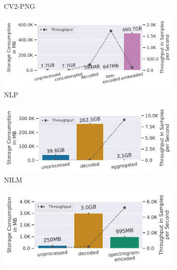 {\begin{figure}[h]
\begin{subfigure}[c]{0.22\textwidth}
        \vspace{-18pt}
        \caption{CV2-PNG}
        \label{fig:ss-vs-thr-cv2-png}
    \end{subfigure}
    \begin{subfigure}[c]{0.22\textwidth}
        \includegraphics[width=\textwidth]{figures/openwebtext-pipeline/storage-vs-throughput.pdf}
        \vspace{-18pt}
        \caption{NLP}
        \label{fig:ss-vs-thr-nlp}
    \end{subfigure}
    \begin{subfigure}[c]{0.22\textwidth}
        \includegraphics[width=\textwidth]{figures/cream-pipeline/storage-vs-throughput.pdf}
        \vspace{-18pt}
        \caption{NILM}
        \label{fig:ss-vs-thr-nilm}
    \end{subfigure}
    \begin{subfigure}[c]{0.22\textwidth}
        \includegraphics[width=\textwidth]{figures/commonvoice-pipeline/storage-vs-throughput.pdf}

\end{subfigure}
\end{figure}}
